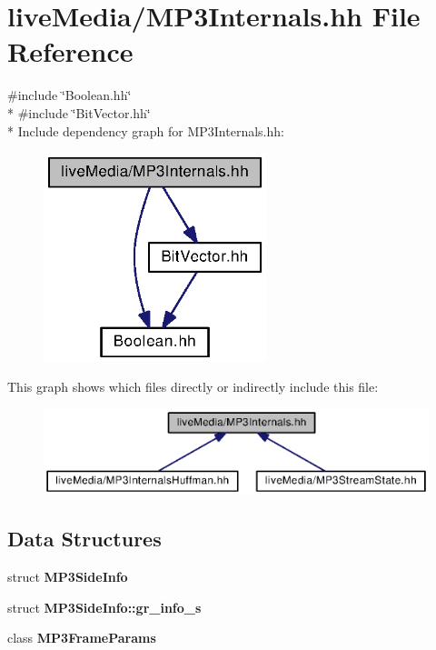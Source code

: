 \section{live\+Media/\+M\+P3\+Internals.hh File Reference}
\label{MP3Internals_8hh}
{\ttfamily \#include \char`\"{}Boolean.\+hh\char`\"{}}\\*
{\ttfamily \#include \char`\"{}Bit\+Vector.\+hh\char`\"{}}\\*
Include dependency graph for M\+P3\+Internals.\+hh\+:
\nopagebreak
\begin{figure}[H]
\begin{center}
\leavevmode
\includegraphics[width=184pt]{MP3Internals_8hh__incl}
\end{center}
\end{figure}
This graph shows which files directly or indirectly include this file\+:
\nopagebreak
\begin{figure}[H]
\begin{center}
\leavevmode
\includegraphics[width=350pt]{MP3Internals_8hh__dep__incl}
\end{center}
\end{figure}
\subsection*{Data Structures}
\begin{DoxyCompactItemize}
\item 
struct {\bf M\+P3\+Side\+Info}
\item 
struct {\bf M\+P3\+Side\+Info\+::gr\+\_\+info\+\_\+s}
\item 
class {\bf M\+P3\+Frame\+Params}
\end{DoxyCompactItemize}
